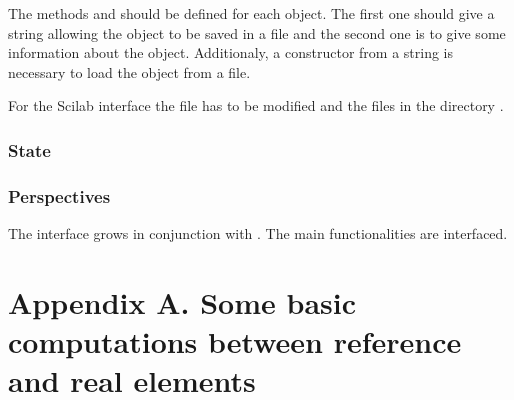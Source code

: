\documentclass[a4paper,11pt,english]{sphinxmanual}
\begin{document}
The methods  and  should be defined for each object. The first one should give a string allowing the object to be saved in a file and the second one is to give some information about the object. Additionaly, a constructor from a string is necessary to load the object from a file.

For the Scilab interface the file  has to be modified and the files in the directory .


\subsection{State}
\label{\detokenize{project/libdesc_interface:state}}

\subsection{Perspectives}
\label{\detokenize{project/libdesc_interface:perspectives}}
The interface grows in conjunction with . The main  functionalities are interfaced.


\chapter{Appendix A. Some basic computations between reference and real elements}
\label{\detokenize{project/appendixA:appendix-a-some-basic-computations-between-reference-and-real-elements}}\label{\detokenize{project/appendixA:dp-appendixa}}\label{\detokenize{project/appendixA::doc}}
\end{document}
